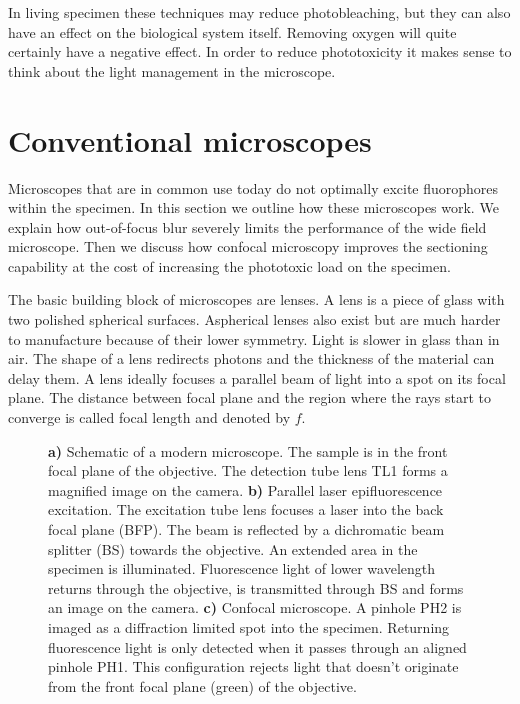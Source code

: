 In living specimen these techniques may reduce photobleaching, but      
they can also have an effect on the biological system itself. Removing
oxygen will quite certainly have a negative effect. In order to reduce
phototoxicity it makes sense to think about the light management in
the microscope.


\section{Conventional microscopes}
\begin{summary}
  Microscopes that are in common use today do not optimally excite
  fluorophores within the specimen. In this section we outline how
  these microscopes work. We explain how out-of-focus blur severely
  limits the performance of the wide field microscope. Then we discuss
  how confocal microscopy improves the sectioning capability at the
  cost of increasing the phototoxic load on the specimen.
\end{summary}
The basic building block of microscopes are lenses. A lens is a piece
of glass with two polished spherical surfaces. Aspherical lenses also
exist but are much harder to manufacture because of their lower
symmetry. Light is slower in glass than in air. The shape of a lens
redirects photons and the thickness of the material can delay them. A
lens ideally focuses a parallel beam of light into a spot on its focal
plane. The distance between focal plane and the region where the rays
start to converge is called focal length and denoted by $f$.
\begin{figure}[!hbt]
  \centering
  \caption{{\bf a)} Schematic of a modern microscope. The sample is in
    the front focal plane of the objective. The detection tube lens
    TL1 forms a magnified image on the camera. {\bf b)} Parallel laser
    epifluorescence excitation. The excitation tube lens focuses a
    laser into the back focal plane (BFP). The beam is reflected by a
    dichromatic beam splitter (BS) towards the objective. An extended
    area in the specimen is illuminated. Fluorescence light of lower
    wavelength returns through the objective, is transmitted through
    BS and forms an image on the camera. {\bf c)} Confocal
    microscope. A pinhole PH2 is imaged as a diffraction limited spot
    into the specimen. Returning fluorescence light is only detected
    when it passes through an aligned pinhole PH1. This configuration
    rejects light that doesn't originate from the front focal plane
    (green) of the objective.}
  \label{fig:widefield-microscope}
\end{figure}

